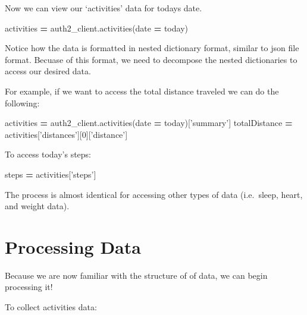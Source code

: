 \documentclass[]{book}
\newenvironment{Shaded}{\begin{snugshade}}{\end{snugshade}}
\newcommand{\DecValTok}[1]{\textcolor[rgb]{0.00,0.00,0.81}{#1}}
\newcommand{\StringTok}[1]{\textcolor[rgb]{0.31,0.60,0.02}{#1}}
\newcommand{\OperatorTok}[1]{\textcolor[rgb]{0.81,0.36,0.00}{\textbf{#1}}}
\newcommand{\NormalTok}[1]{#1}
\begin{document}
Now we can view our `activities' data for todays date.

\begin{Shaded}
\begin{Highlighting}[]
\NormalTok{activities }\OperatorTok{=}\NormalTok{ auth2_client.activities(date }\OperatorTok{=}\NormalTok{ today)}
\end{Highlighting}
\end{Shaded}

Notice how the data is formatted in nested dictionary format, similar to
json file format. Becuase of this format, we need to decompose the
nested dictionaries to access our desired data.

For example, if we want to access the total distance traveled we can do
the following:

\begin{Shaded}
\begin{Highlighting}[]
\NormalTok{activities }\OperatorTok{=}\NormalTok{ auth2_client.activities(date }\OperatorTok{=}\NormalTok{ today)[}\StringTok{'summary'}\NormalTok{]}
\NormalTok{totalDistance }\OperatorTok{=}\NormalTok{ activities[}\StringTok{'distances'}\NormalTok{][}\DecValTok{0}\NormalTok{][}\StringTok{'distance'}\NormalTok{]}
\end{Highlighting}
\end{Shaded}

To access today's steps:

\begin{Shaded}
\begin{Highlighting}[]
\NormalTok{steps }\OperatorTok{=}\NormalTok{ activities[}\StringTok{'steps'}\NormalTok{]}
\end{Highlighting}
\end{Shaded}

The process is almost identical for accessing other types of data
(i.e.~sleep, heart, and weight data).

\section{Processing Data}\label{processing-data}

Because we are now familiar with the structure of of data, we can begin
processing it!

To collect activities data:
\end{document}
